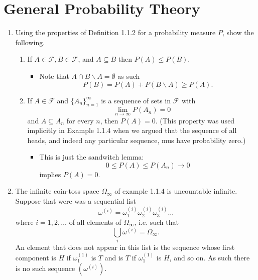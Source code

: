 \documentclass{article}
\newcommand{\F}{\mathcal{F}}
\begin{document}
\tableofcontents

\newpage

\section{General Probability Theory}
\begin{enumerate}
\item Using the properties of Definition 1.1.2 for a probability measure $P$, show the following.
\begin{enumerate}
	\item If $A \in \F, B \in \F$, and $A \subseteq B$ then $P(A) \leq P(B)$.
		\begin{itemize}
			\item Note that $A \cap B \backslash A = \emptyset$ as such
			$$
			P(B) = P(A) + P(B \backslash A) \geq P(A).
			$$
		\end{itemize}
	\item If $A \in \F$ and $\{A_n\}_{n = 1}^\infty$ is a sequence of sets in $\F$ with
	$$
	\lim_{n \rightarrow \infty} P(A_n) = 0
	$$
	and $A \subseteq A_n$ for every $n$, then $P(A) = 0$. (This property was used implicitly in Example 1.1.4 when we argued that the sequence of all heads, and indeed any particular sequence, mus have probability zero.)
		\begin{itemize}
			\item This is just the sandwitch lemma:
			$$
			0 \leq P(A) \leq P(A_n) \rightarrow 0
			$$
			implies $P(A) = 0$.
		\end{itemize}
\end{enumerate}
	\item The infinite coin-toss space $\Omega_\infty$ of example 1.1.4 is uncountable infinite. Suppose that were was a sequential list
	$$
	\omega^{(i)} = \omega^{(i)}_1 \omega^{(i)}_2 \omega^{(i)}_3 \dots
	$$
	where $i = 1, 2, \dots$ of all elements of $\Omega_\infty$, i.e. such that
	$$
	\bigcup_i \omega^{(i)} = \Omega_\infty.
	$$
	An element that does not appear in this list is the sequence whose first component is $H$ if $\omega_1^{(1)}$ is $T$ and is $T$ if $\omega_1^{(1)}$ is $H$, and so on. As such there is no such sequence $(\omega^{(i)})$.


\end{enumerate}
\end{document}
